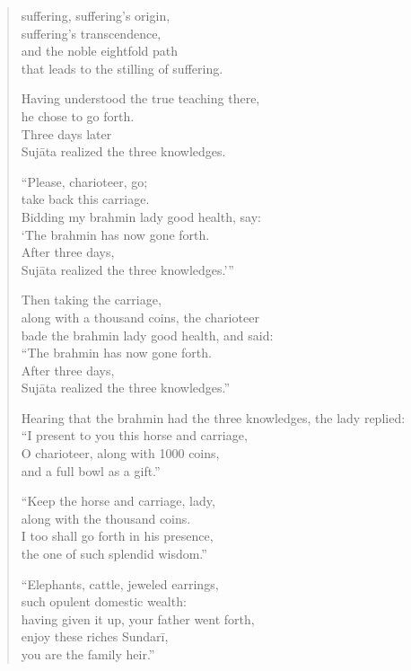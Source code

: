 \documentclass[12pt,openany]{book}%
\begin{document}
\begin{verse}
suffering, suffering’s origin, \\
suffering’s transcendence, \\
and the noble eightfold path \\
that leads to the stilling of suffering. 

Having understood the true teaching there, \\
he chose to go forth. \\
Three days later \\
\textsanskrit{Sujāta} realized the three knowledges. 

“Please, charioteer, go; \\
take back this carriage. \\
Bidding my brahmin lady good health, say: \\
‘The brahmin has now gone forth. \\
After three days, \\
\textsanskrit{Sujāta} realized the three knowledges.’” 

Then taking the carriage, \\
along with a thousand coins, the charioteer \\
bade the brahmin lady good health, and said: \\
“The brahmin has now gone forth. \\
After three days, \\
\textsanskrit{Sujāta} realized the three knowledges.” 

Hearing that the brahmin had the three knowledges, the lady replied: \\
“I present to you this horse and carriage, \\
O charioteer, along with 1000 coins, \\
and a full bowl as a gift.” 

“Keep the horse and carriage, lady, \\
along with the thousand coins. \\
I too shall go forth in his presence, \\
the one of such splendid wisdom.” 

“Elephants, cattle, jeweled earrings, \\
such opulent domestic wealth: \\
having given it up, your father went forth, \\
enjoy these riches \textsanskrit{Sundarī}, \\
you are the family heir.” 


\end{verse}
\end{document}

